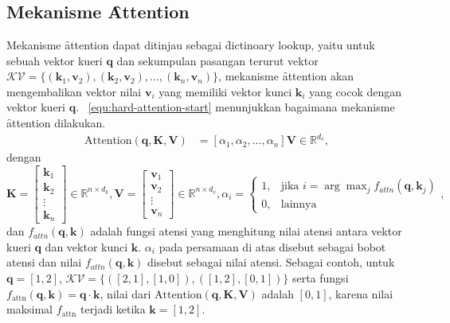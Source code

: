 \chapter{\babTiga}
\label{bab:3}


\section{Mekanisme \f{Attention}}
Mekanisme \f{attention} dapat ditinjau sebagai \f{dictinoary lookup}, yaitu untuk sebuah vektor kueri $\mathbf{q}$ dan sekumpulan pasangan terurut vektor $\mathcal{KV} = \{(\mathbf{k}_1, \mathbf{v}_2), (\mathbf{k}_2, \mathbf{v}_2), \dots, (\mathbf{k}_n, \mathbf{v}_n)\}$, mekanisme \f{attention} akan mengembalikan vektor nilai $\mathbf{v}_i$ yang memiliki vektor kunci $\mathbf{k}_i$ yang cocok dengan vektor kueri $\mathbf{q}$. \equ~\ref{equ:hard-attention-start} menunjukkan bagaimana mekanisme \f{attention} dilakukan.
\begin{align}
	\label{equ:hard-attention-start}
	\text{Attention}(\mathbf{q}, \mathbf{K}, \mathbf{V}) &= [\alpha_{1}, \alpha_{2}, \dots, \alpha_{n}]\mathbf{V} \in \mathbb{R}^{d_v},
\end{align}
dengan 
$\mathbf{K}= \begin{bmatrix}
			\mathbf{k}_1 \\
			\mathbf{k}_2 \\
			\vdots \\
			\mathbf{k}_n
		\end{bmatrix} \in \mathbb{R}^{n \times d_k},
		\mathbf{V} = \begin{bmatrix}
			\mathbf{v}_1 \\
			\mathbf{v}_2 \\
			\vdots \\
			\mathbf{v}_n
		\end{bmatrix} \in \mathbb{R}^{n \times d_v},
	\alpha_i = 
	\begin{cases}
		1, & \text{jika } i = \arg\max_{j} f_{attn}(\mathbf{q}, \mathbf{k}_j) \\
	0, & \text{lainnya}
	\end{cases},$
  dan $f_{attn}(\mathbf{q}, \mathbf{k})$ adalah fungsi atensi yang menghitung nilai atensi antara vektor kueri $\mathbf{q}$ dan vektor kunci $\mathbf{k}$. $\alpha_i$ pada persamaan di atas disebut sebagai bobot atensi dan nilai $f_{attn}(\mathbf{q}, \mathbf{k})$ disebut sebagai nilai atensi. Sebagai contoh, untuk $\mathbf{q}= [1,2]$, $\mathcal{KV} = \{([2,1],[1,0]), ([1,2],[0,1])\}$ serta fungsi $f_\text{attn}(\mathbf{q}, \mathbf{k}) =\mathbf{q}\cdot \mathbf{k}$, nilai dari $\text{Attention}( \mathbf{q}, \mathbf{K}, \mathbf{V})$ adalah $[0,1]$, karena nilai maksimal $f_\text{attn}$ terjadi ketika $\mathbf{k} = [1,2]$. 

